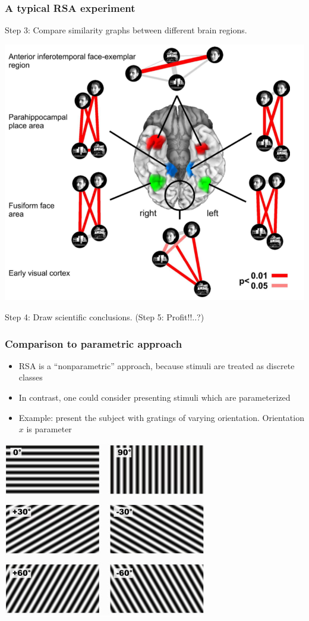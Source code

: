 \documentclass{beamer}
\begin{document}
\begin{frame}
\frametitle{A typical RSA experiment}
Step 3: Compare similarity graphs between different brain regions.
\begin{center}
\includegraphics[scale = 0.2]{k08_step3.png}
\end{center}
Step 4: Draw scientific conclusions.  (Step 5: Profit!!..?)
\end{frame}

\begin{frame}
\frametitle{Comparison to parametric approach}
\begin{itemize}
\item RSA is a ``nonparametric'' approach, because stimuli are treated as discrete classes
\item In contrast, one could consider presenting stimuli which are parameterized
\item Example: present the subject with gratings of varying orientation.  Orientation $x$ is parameter
\end{itemize}
\begin{center}
\includegraphics[scale = 0.2]{grating_angle.png}
\end{center}
\end{frame}
\end{document}
